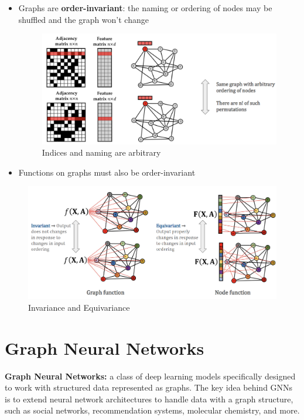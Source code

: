 \begin{itemize}
    \item Graphs are \textbf{order-invariant}: the naming or ordering of nodes may be shuffled and the graph won't change

\begin{figure}[h!t]
    \centering
    \includegraphics[width=0.75\linewidth]{orderinvarian.png}
    \caption{Indices and naming are arbitrary}
    \label{fig:enter-label}
\end{figure}

    \item Functions on graphs must also be order-invariant
\end{itemize}

\begin{figure}[h!t]
    \centering
    \includegraphics[width=0.75\linewidth]{fnorderinv.png}
    \caption{Invariance and Equivariance}
    \label{fig:enter-label}
\end{figure}


\section{Graph Neural Networks}
\begin{definition}
    \textbf{Graph Neural Networks:} a class of deep learning models specifically designed to work with structured data represented as graphs. The key idea behind GNNs is to extend neural network architectures to handle data with a graph structure, such as social networks, recommendation systems, molecular chemistry, and more.
\end{definition}

